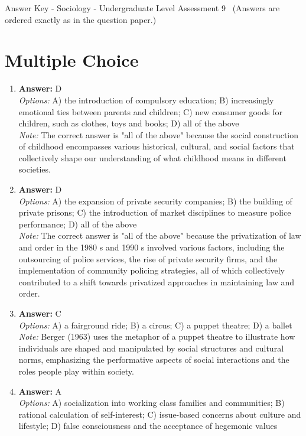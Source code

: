 \documentclass[12pt]{article}
\begin{document}
\begin{center}
Answer Key - Sociology - Undergraduate Level Assessment 9 \
\small (Answers are ordered exactly as in the question paper.)
\end{center}

\section*{Multiple Choice}
\begin{enumerate}[label=\arabic*.]
\item \textbf{Answer:} D
\\ \textit{Options:} A) the introduction of compulsory education; B) increasingly emotional ties between parents and children; C) new consumer goods for children, such as clothes, toys and books; D) all of the above
\\ \textit{Note:} The correct answer is "all of the above" because the social construction of childhood encompasses various historical, cultural, and social factors that collectively shape our understanding of what childhood means in different societies.
\item \textbf{Answer:} D
\\ \textit{Options:} A) the expansion of private security companies; B) the building of private prisons; C) the introduction of market disciplines to measure police performance; D) all of the above
\\ \textit{Note:} The correct answer is "all of the above" because the privatization of law and order in the 1980 s and 1990 s involved various factors, including the outsourcing of police services, the rise of private security firms, and the implementation of community policing strategies, all of which collectively contributed to a shift towards privatized approaches in maintaining law and order.
\item \textbf{Answer:} C
\\ \textit{Options:} A) a fairground ride; B) a circus; C) a puppet theatre; D) a ballet
\\ \textit{Note:} Berger (1963) uses the metaphor of a puppet theatre to illustrate how individuals are shaped and manipulated by social structures and cultural norms, emphasizing the performative aspects of social interactions and the roles people play within society.
\item \textbf{Answer:} A
\\ \textit{Options:} A) socialization into working class families and communities; B) rational calculation of self-interest; C) issue-based concerns about culture and lifestyle; D) false consciousness and the acceptance of hegemonic values

\end{enumerate}
\end{document}
